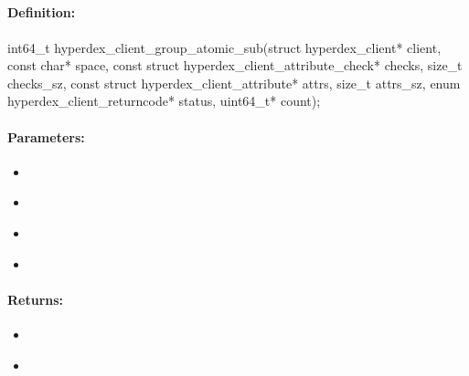 \pagebreak
\subsection{}
\label{api:c:group_atomic_sub}


\paragraph{Definition:}
\begin{ccode}
int64_t hyperdex_client_group_atomic_sub(struct hyperdex_client* client,
        const char* space,
        const struct hyperdex_client_attribute_check* checks, size_t checks_sz,
        const struct hyperdex_client_attribute* attrs, size_t attrs_sz,
        enum hyperdex_client_returncode* status,
        uint64_t* count);
\end{ccode}

\paragraph{Parameters:}
\begin{itemize}[noitemsep]
\item {}\\

\item {}\\

\item {}\\

\item {}\\

\end{itemize}

\paragraph{Returns:}
\begin{itemize}[noitemsep]
\item {}\\

\item {}\\

\end{itemize}

